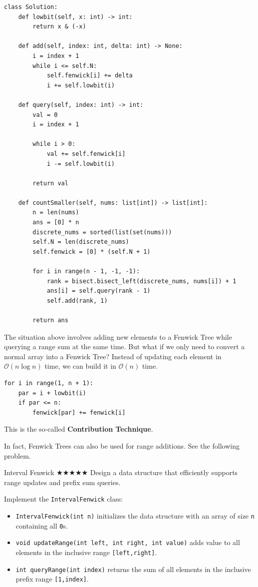 \documentclass{article}
\begin{document}
\begin{lstlisting}[style=python]
class Solution:
    def lowbit(self, x: int) -> int:
        return x & (-x)

    def add(self, index: int, delta: int) -> None:
        i = index + 1
        while i <= self.N:
            self.fenwick[i] += delta
            i += self.lowbit(i)

    def query(self, index: int) -> int:
        val = 0
        i = index + 1
        
        while i > 0:
            val += self.fenwick[i]
            i -= self.lowbit(i)
            
        return val

    def countSmaller(self, nums: list[int]) -> list[int]:
        n = len(nums)
        ans = [0] * n
        discrete_nums = sorted(list(set(nums)))
        self.N = len(discrete_nums)
        self.fenwick = [0] * (self.N + 1)
        
        for i in range(n - 1, -1, -1):
            rank = bisect.bisect_left(discrete_nums, nums[i]) + 1
            ans[i] = self.query(rank - 1)
            self.add(rank, 1)
            
        return ans
\end{lstlisting}

The situation above involves adding new elements to a Fenwick Tree while querying a range sum at the same time. But what if we only need to convert a normal array into a Fenwick Tree? Instead of updating each element in $\mathcal{O}(n\log n)$ time, we can build it in $\mathcal{O}(n)$ time.

\begin{lstlisting}[style=python]
for i in range(1, n + 1):
    par = i + lowbit(i)
    if par <= n:
        fenwick[par] += fenwick[i]
\end{lstlisting}

This is the so-called \textbf{Contribution Technique}.

In fact, Fenwick Trees can also be used for range additions. See the following problem.

\begin{Question}{Interval Fenwick $\bigstar\bigstar\bigstar\bigstar\bigstar$}
Design a data structure that efficiently supports range updates and prefix sum queries.

Implement the \texttt{IntervalFenwick} class:

\begin{itemize}
    \item \texttt{IntervalFenwick(int n)} initializes the data structure with an array of size \texttt{n} containing all \texttt{0}s.
    \item \texttt{void updateRange(int left, int right, int value)} adds value to all elements in the inclusive range \texttt{[left,right]}.
    \item \texttt{int queryRange(int index)} returns the sum of all elements in the inclusive prefix range \texttt{[1,index]}.
\end{itemize}
\end{Question}
\end{document}
